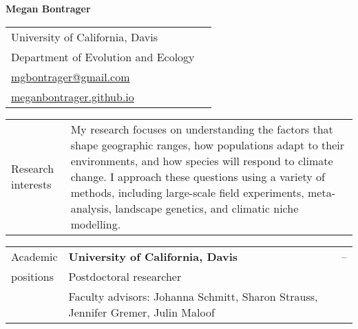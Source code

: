 \documentclass[letterpaper,11pt,oneside]{article}
\begin{document}



\noindent  \LARGE{\textbf{Megan Bontrager}} 

\normalsize

\bigskip

\noindent \begin{tabular}{@{} p{8cm} >{\raggedleft\arraybackslash}p{8.11cm}}
University of California, Davis & \\
Department of Evolution and Ecology & \\
{\href{mailto:mgbontrager@gmail.com}{mgbontrager@gmail.com}} & \\
{\href{https://meganbontrager.github.io}{meganbontrager.github.io}} & \\

\end{tabular}
\vspace{1em}


\noindent\hrulefill 

\bigskip
\bigskip



\noindent \begin{tabular}{@{} p{3cm} p{13.11cm}}
\Large{Research interests} & My research focuses on understanding the factors that shape geographic ranges, how populations adapt to their environments, and how species will respond to climate change. I approach these questions using a variety of methods, including large-scale field experiments, meta-analysis, landscape genetics, and climatic niche modelling. \\
\end{tabular}
\bigskip



\noindent \begin{tabular}{@{} p{3cm} p{10.91cm} >{\raggedleft\arraybackslash}p{1.7cm}}
\Large{Academic}    & \textbf{University of California, Davis} & 2018--\hspace*{0.8cm} \\
\Large{positions}   & Postdoctoral researcher & \\
& \raggedright{Faculty advisors: Johanna Schmitt, Sharon Strauss, Jennifer Gremer, Julin Maloof} & \\
\end{tabular}
\bigskip


\end{document}
